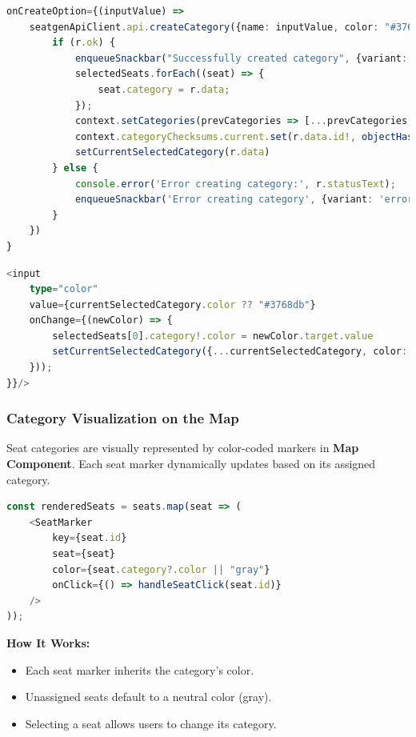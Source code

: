 \begin{lstlisting}[language=TypeScript, caption=Managing Categories, label=lst:manage-categories]
onCreateOption={(inputValue) =>
    seatgenApiClient.api.createCategory({name: inputValue, color: "#3768db"}).then((r) => {
        if (r.ok) {
            enqueueSnackbar("Successfully created category", {variant: 'success'})
            selectedSeats.forEach((seat) => {
                seat.category = r.data;
            });
            context.setCategories(prevCategories => [...prevCategories, r.data]);
            context.categoryChecksums.current.set(r.data.id!, objectHash(r.data))
            setCurrentSelectedCategory(r.data)
        } else {
            console.error('Error creating category:', r.statusText);
            enqueueSnackbar('Error creating category', {variant: 'error'});
        }
    })
}
\end{lstlisting}

\begin{lstlisting}[language=TypeScript, caption=Managing Category Color, label=lst:manage-categories]
<input 
    type="color"
    value={currentSelectedCategory.color ?? "#3768db"}
    onChange={(newColor) => {
        selectedSeats[0].category!.color = newColor.target.value
        setCurrentSelectedCategory({...currentSelectedCategory, color: newColor.target.value})
    }));
}}/>
\end{lstlisting}

\subsubsection{Category Visualization on the Map}

Seat categories are visually represented by color-coded markers in \textbf{Map Component}. Each seat marker dynamically updates based on its assigned category.

\begin{lstlisting}[language=TypeScript, caption=Rendering Seat Markers with Categories, label=lst:render-seat-category]
const renderedSeats = seats.map(seat => (
    <SeatMarker 
        key={seat.id} 
        seat={seat} 
        color={seat.category?.color || "gray"} 
        onClick={() => handleSeatClick(seat.id)}
    />
));
\end{lstlisting}

\textbf{How It Works:}
\begin{itemize}
    \item Each seat marker inherits the category's color.
    \item Unassigned seats default to a neutral color (gray).
    \item Selecting a seat allows users to change its category.
\end{itemize}

